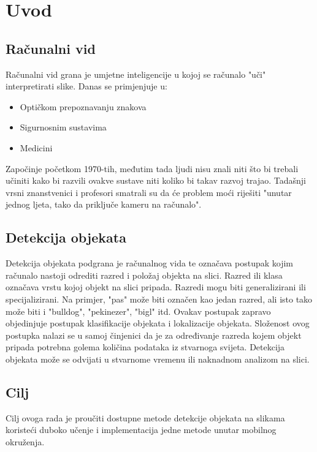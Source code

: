 \chapter{Uvod}
\section{Računalni vid}
Računalni vid grana je umjetne inteligencije u kojoj se računalo "uči" interpretirati slike. 
Danas se primjenjuje u:
\begin{itemize}
    \item Optičkom prepoznavanju znakova
    \item Sigurnosnim sustavima
    \item Medicini
\end{itemize}
Započinje početkom 1970-tih, međutim tada ljudi nisu znali niti što bi trebali učiniti kako bi razvili ovakve sustave niti koliko
bi takav razvoj trajao. Tadašnji vrsni znanstvenici i profesori smatrali su da će problem moći riješiti "unutar jednog ljeta, tako da priključe kameru na računalo". \citep{szeliski2010computer}

\section{Detekcija objekata}
Detekcija objekata podgrana je računalnog vida te označava postupak kojim računalo nastoji odrediti razred
i položaj objekta na slici. Razred ili klasa  označava vrstu kojoj objekt na slici pripada. Razredi mogu biti generalizirani ili specijalizirani. 
Na primjer, "pas" može biti označen kao jedan razred, ali isto tako može biti i "bulldog", "pekinezer", "bigl" itd.
Ovakav postupak zapravo objedinjuje postupak klasifikacije objekata i lokalizacije objekata.
Složenost ovog postupka nalazi se u samoj činjenici da je za određivanje razreda kojem objekt pripada potrebna golema količina podataka 
iz stvarnoga svijeta. Detekcija objekata može se odvijati u stvarnome vremenu   ili naknadnom analizom na slici.


\section{Cilj}
Cilj ovoga rada je proučiti dostupne metode detekcije objekata na slikama koristeći duboko učenje i implementacija jedne metode unutar mobilnog okruženja. 
 
